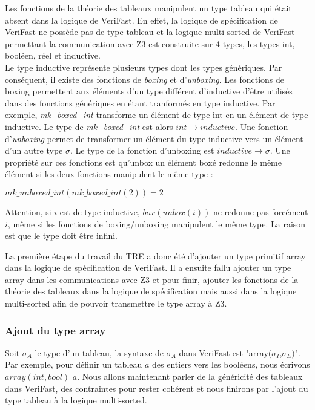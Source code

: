 \documentclass[11pt,openany]{article}
\newcommand{\verifast}{VeriFast}
\begin{document}
	Les fonctions de la th\'eorie des tableaux manipulent un type tableau qui \'etait absent dans la logique de \verifast{}. En effet, la logique de sp\'ecification de \verifast{} ne poss\`ede pas de type tableau et la logique multi-sorted de \verifast{} permettant la communication avec Z3 est construite sur 4 types, les types int, bool\'een, r\'eel et inductive.\\
	Le type inductive repr\'esente plusieurs types dont les types g\'en\'eriques. Par cons\'equent, il existe des fonctions de \textit{boxing} et d'\textit{unboxing}. Les fonctions de boxing permettent aux \'el\'ements d'un type diff\'erent d'inductive d'\^etre utilis\'es dans des fonctions g\'en\'eriques en \'etant tranform\'es en type inductive. Par exemple, \textit{mk_boxed_int} transforme un \'el\'ement de type int en un \'el\'ement de type inductive. Le type de \textit{mk_boxed_int} est alors $int \rightarrow inductive$. Une fonction d'\textit{unboxing} permet de transformer un \'el\'ement du type inductive vers un \'el\'ement d'un autre type $\sigma$. Le type de la fonction d'unboxing est $inductive \rightarrow \sigma$. Une propri\'et\'e sur ces fonctions est qu'unbox un \'el\'ement box\'e redonne le m\^eme \'el\'ement si les deux fonctions manipulent le m\^eme type :
	\begin{center}
		$mk\_unboxed\_int(mk\_boxed\_int(2)) = 2$
	\end{center}
	Attention, si $i$ est de type inductive, $box(unbox(i))$ ne redonne pas forc\'ement $i$, m\^eme si les fonctions de boxing/unboxing manipulent le m\^eme type. La raison est que le type doit \^etre infini.
	 
	La premi\`ere \'etape du travail du TRE a donc \'et\'e d'ajouter un type primitif array dans la logique de sp\'ecification de \verifast{}. Il a ensuite fallu ajouter un type array dans les communications avec Z3 et pour finir, ajouter les fonctions de la th\'eorie des tableaux dans la logique de sp\'ecification mais aussi dans la logique multi-sorted afin de pouvoir transmettre le type array \`a Z3.
		\subsubsection{Ajout du type array}
		Soit $\sigma_A$ le type d'un tableau, la syntaxe de $\sigma_A$ dans \verifast{} est "array$(\sigma_I$,$\sigma_E)$". Par exemple, pour d\'efinir un tableau $a$ des entiers vers les bool\'eens, nous \'ecrivons $array(int,bool)$ $a$. Nous allons maintenant parler de la g\'en\'ericit\'e des tableaux dans \verifast{}, des contraintes pour rester coh\'erent et nous finirons par l'ajout du type tableau \`a la logique multi-sorted.
\end{document}
